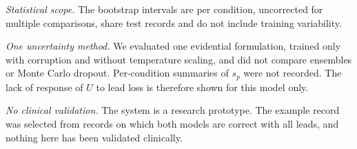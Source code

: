 \emph{Statistical scope.} The bootstrap intervals are per condition, uncorrected for multiple comparisons, share test
records and do not include training variability.

\emph{One uncertainty method.} We evaluated one evidential formulation, trained only with corruption and without
temperature scaling, and did not compare ensembles or Monte Carlo dropout. Per-condition summaries of $s_p$ were not
recorded. The lack of response of $U$ to lead loss is therefore shown for this model only.

\emph{No clinical validation.} The system is a research prototype. The example record was selected from records on
which both models are correct with all leads, and nothing here has been validated clinically.
